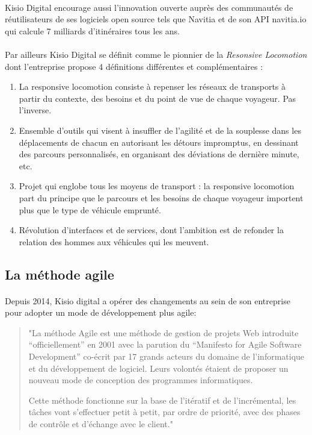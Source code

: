 \documentclass[a4paper]{report}
\begin{document}
\paragraph{} Kisio Digital encourage aussi l'innovation ouverte auprès des communautés de réutilisateurs de ses logiciels open source tels que Navitia et de son API navitia.io qui calcule 7 milliards d'itinéraires tous les ans.

\paragraph{} Par ailleurs Kisio Digital se définit comme le pionnier de la \emph{Resonsive Locomotion} dont l'entreprise propose 4 définitions différentes et complémentaires\cite{ref_canal_tp} :

\begin{enumerate}
	\item La responsive locomotion consiste à repenser les réseaux de transports à partir du contexte, des besoins et du point de vue de chaque voyageur. Pas l'inverse.
	\item Ensemble d'outils qui visent à insuffler de l'agilité et de la souplesse dans les déplacements de chacun en autorisant les détours impromptus, en dessinant des parcours personnalisés, en organisant des déviations de dernière minute, etc.
	\item Projet qui englobe tous les moyens de transport : la responsive locomotion part du principe que le parcours et les besoins de chaque voyageur importent plus que le type de véhicule emprunté.
	\item Révolution d'interfaces et de services, dont l'ambition est de refonder la relation des hommes aux véhicules qui les meuvent.
\end{enumerate}

\subsection{La méthode agile}

\paragraph {}Depuis 2014, Kisio digital a opérer des changements au sein de son entreprise pour adopter un mode de développement plus agile:

\begin{quote}
"La méthode Agile est une méthode de gestion de projets Web introduite “officiellement” en 2001 avec la parution du “Manifesto for Agile Software Development” co-écrit par 17 grands acteurs du domaine de l’informatique et du développement de logiciel. Leurs volontés étaient de proposer un nouveau mode de conception des programmes informatiques.

Cette méthode fonctionne sur la base de l'itératif et de l’incrémental, les tâches vont s’effectuer petit à petit, par ordre de priorité, avec des  phases de contrôle et d’échange avec le client."\cite{ref_agile}
\end{quote}
\end{document}
